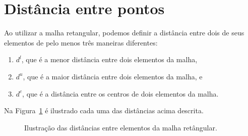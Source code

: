 %
%
%

\section{Distância entre pontos} \label{sse:distance}
Ao utilizar a malha retangular, podemos definir a distância entre dois
de seus elementos de pelo menos três maneiras diferentes:
\begin{enumerate}
    \item $d^l$, que é a menor distância entre dois elementos da malha,
    \item $d^u$, que é a maior distância entre dois elementos da malha, e
    \item $d^c$, que é a distância entre os centros de dois elementos da malha.
\end{enumerate}
Na Figura~\ref{fig:dist_malha} é ilustrado cada uma das distâncias acima
descrita.
\begin{figure}[!htb]
    \centering
    \caption{Ilustra\c{c}\~{a}o das dist\^{a}ncias entre elementos da malha
    retângular.}
    \label{fig:dist_malha}
\end{figure}
